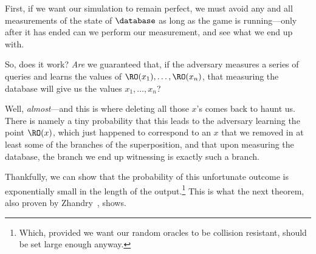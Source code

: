       First, if we want our simulation to remain perfect, we must avoid any
        and all measurements of the state of $\database$ as long as the game is
        running---only after it has ended can we perform our measurement, and
        see what we end up with.

      So, does it work? \emph{Are} we guaranteed that, if the adversary
        measures a series of queries and learns the values of $\RO(x_1), \ldots,
        \RO(x_n)$, that measuring the database will give us the values $x_1,
        \ldots, x_n$?

      Well, \emph{almost}---and this is where deleting all those $x$'s 
        comes back to haunt us. There is namely a tiny
        probability that this leads to the adversary learning the point
        $\RO(x)$, which just happened to correspond to an $x$ that we removed
        in at least some of the branches of the superposition, and that upon
        measuring the database, the branch we end up witnessing is exactly such
        a branch.

      Thankfully, we can show that the probability of this unfortunate outcome
        is exponentially small in the length of the output.\footnote{
          Which, provided we want our random oracles to be collision resistant, should
          be set large enough anyway.
        } This is what the next theorem, also proven by
        Zhandry~\cite[Lemma~5]{C:Zhandry19}, shows.

